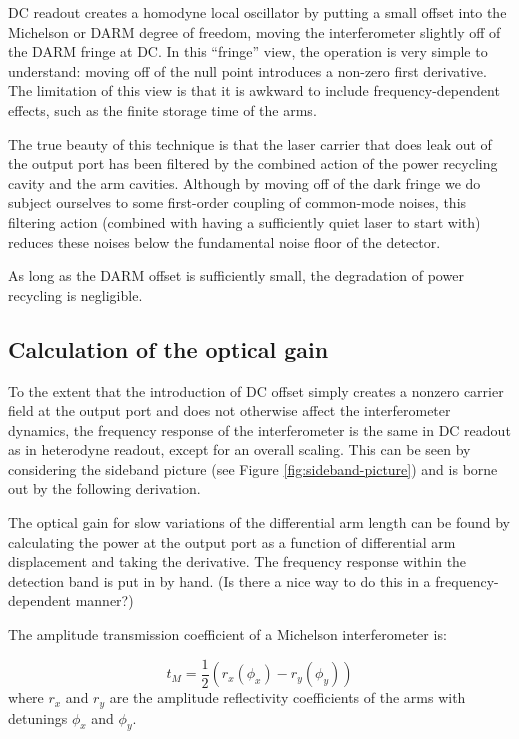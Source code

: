 
DC readout creates a homodyne local oscillator by putting a small
offset into the Michelson or DARM degree of freedom, moving the
interferometer slightly off of the DARM fringe at DC.  In this
``fringe'' view, the operation is very simple to understand: moving
off of the null point introduces a non-zero first derivative.  The
limitation of this view is that it is awkward to include
frequency-dependent effects, such as the finite storage time of the
arms.

The true beauty of this technique is that the laser carrier that does
leak out of the output port has been filtered by the combined action of
the power recycling cavity and the arm cavities.  Although by moving
off of the dark fringe we do subject ourselves to some first-order
coupling of common-mode noises, this filtering action (combined with
having a sufficiently quiet laser to start with) reduces these noises
below the fundamental noise floor of the detector.  

As long as the DARM offset is sufficiently small, the degradation of
power recycling is negligible.


\subsection{Calculation of the optical gain}

To the extent that the introduction of DC offset simply creates a
nonzero carrier field at the output port and does not otherwise affect
the interferometer dynamics, the frequency response of the interferometer
is the same in DC readout as in heterodyne readout, except for an
overall scaling. This can be seen by considering the sideband picture
(see Figure \ref{fig:sideband-picture}) and is borne out by the following
derivation.%

The optical gain for slow variations of the differential arm length
can be found by calculating the power at the output port as a function
of differential arm displacement and taking the derivative. The frequency
response within the detection band is put in by hand. (Is there a
nice way to do this in a frequency-dependent manner?)

The amplitude transmission coefficient of a Michelson interferometer
is:

\begin{equation}
t_{M}=\frac{1}{2}\left(r_{x}\left(\phi_{x}\right)-r_{y}\left(\phi_{y}\right)\right)\end{equation}
where $r_{x}$ and $r_{y}$ are the amplitude reflectivity coefficients
of the arms with detunings $\phi_{x}$ and $\phi_{y}$. 

